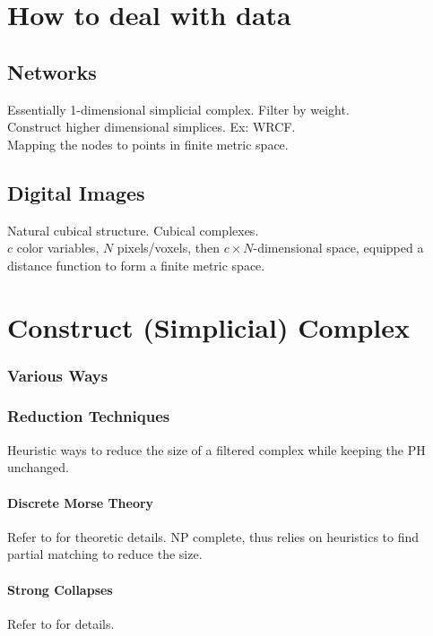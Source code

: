 \documentclass[10pt,a4paper]{article}
\begin{document}
\section{How to deal with data}
\subsection{Networks}
Essentially 1-dimensional simplicial complex. Filter by weight.\\
Construct higher dimensional simplices. Ex: WRCF.\\
Mapping the nodes to points in finite metric space.
\subsection{Digital Images}
Natural cubical structure. Cubical complexes.\\
$c$ color variables, $N$ pixels/voxels, then $c\times N$-dimensional space, equipped a distance function to form a finite metric space.

\section{Construct (Simplicial) Complex}
\subsubsection{Various Ways}
\subsubsection{Reduction Techniques}
Heuristic ways to reduce the size of a filtered complex while keeping the PH unchanged.
\paragraph{Discrete Morse Theory}
Refer to \cite{Mischaikow2013} for theoretic details. NP complete, thus relies on heuristics to find partial matching to reduce the size.
\paragraph{Strong Collapses}
Refer to \cite{Barmak2012} for details.
\end{document}
